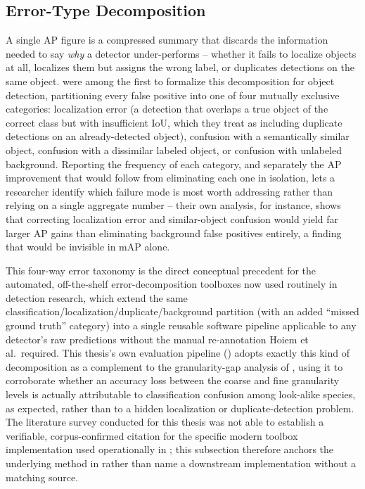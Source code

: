 \subsection{Error-Type Decomposition}\label{sec:lit_error_decomposition}

A single AP figure is a compressed summary that discards the information needed to say \textit{why} a detector under-performs -- whether it fails to localize objects at all, localizes them but assigns the wrong label, or duplicates detections on the same object. \textcite{hoiemDiagnosingErrorObject2012} were among the first to formalize this decomposition for object detection, partitioning every false positive into one of four mutually exclusive categories: localization error (a detection that overlaps a true object of the correct class but with insufficient IoU, which they treat as including duplicate detections on an already-detected object), confusion with a semantically similar object, confusion with a dissimilar labeled object, or confusion with unlabeled background. Reporting the frequency of each category, and separately the AP improvement that would follow from eliminating each one in isolation, lets a researcher identify which failure mode is most worth addressing rather than relying on a single aggregate number -- their own analysis, for instance, shows that correcting localization error and similar-object confusion would yield far larger AP gains than eliminating background false positives entirely, a finding that would be invisible in mAP alone.

This four-way error taxonomy is the direct conceptual precedent for the automated, off-the-shelf error-decomposition toolboxes now used routinely in detection research, which extend the same classification/localization/duplicate/background partition (with an added ``missed ground truth'' category) into a single reusable software pipeline applicable to any detector's raw predictions without the manual re-annotation Hoiem et al.\ required. This thesis's own evaluation pipeline () adopts exactly this kind of decomposition as a complement to the granularity-gap analysis of , using it to corroborate whether an accuracy loss between the coarse and fine granularity levels is actually attributable to classification confusion among look-alike species, as expected, rather than to a hidden localization or duplicate-detection problem. The literature survey conducted for this thesis was not able to establish a verifiable, corpus-confirmed citation for the specific modern toolbox implementation used operationally in ; this subsection therefore anchors the underlying method in \textcite{hoiemDiagnosingErrorObject2012} rather than name a downstream implementation without a matching source.

